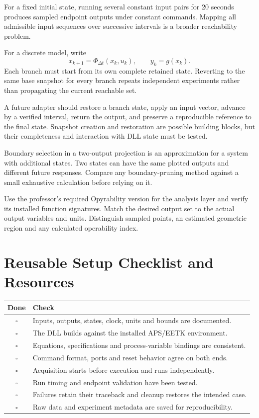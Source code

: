 \documentclass[11pt, letterpaper]{article}
\begin{document}
For a fixed initial state, running several constant input pairs for 20 seconds produces sampled endpoint outputs under constant commands. Mapping all admissible input sequences over successive intervals is a broader reachability problem.

For a discrete model, write
\begin{equation}
x_{k+1}=\Phi_{\Delta t}(x_k,u_k), \qquad y_k=g(x_k).
\end{equation}
Each branch must start from its own complete retained state. Reverting to the same base snapshot for every branch repeats independent experiments rather than propagating the current reachable set.

A future adapter should restore a branch state, apply an input vector, advance by a verified interval, return the output, and preserve a reproducible reference to the final state. Snapshot creation and restoration are possible building blocks, but their completeness and interaction with DLL state must be tested.

Boundary selection in a two-output projection is an approximation for a system with additional states. Two states can have the same plotted outputs and different future responses. Compare any boundary-pruning method against a small exhaustive calculation before relying on it.

Use the professor's required Opyrability version for the analysis layer and verify its installed function signatures. Match the desired output set to the actual output variables and units. Distinguish sampled points, an estimated geometric region and any calculated operability index.

\section{Reusable Setup Checklist and Resources}
\begin{tabularx}{\textwidth}{c X}
\toprule
\textbf{Done} & \textbf{Check} \\
\midrule
$\square$ & Inputs, outputs, states, clock, units and bounds are documented. \\
$\square$ & The DLL builds against the installed APS/EETK environment. \\
$\square$ & Equations, specifications and process-variable bindings are consistent. \\
$\square$ & Command format, ports and reset behavior agree on both ends. \\
$\square$ & Acquisition starts before execution and runs independently. \\
$\square$ & Run timing and endpoint validation have been tested. \\
$\square$ & Failures retain their traceback and cleanup restores the intended case. \\
$\square$ & Raw data and experiment metadata are saved for reproducibility. \\
\bottomrule
\end{tabularx}
\end{document}
